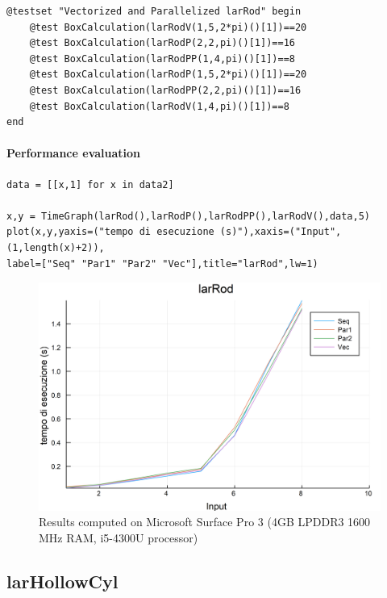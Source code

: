 \documentclass{article}
\begin{document}
\begin{Verbatim}
@testset "Vectorized and Parallelized larRod" begin
	@test BoxCalculation(larRodV(1,5,2*pi)()[1])==20
	@test BoxCalculation(larRodP(2,2,pi)()[1])==16
	@test BoxCalculation(larRodPP(1,4,pi)()[1])==8
	@test BoxCalculation(larRodP(1,5,2*pi)()[1])==20
	@test BoxCalculation(larRodPP(2,2,pi)()[1])==16
	@test BoxCalculation(larRodV(1,4,pi)()[1])==8
end
\end{Verbatim}

\paragraph{Performance evaluation}

\begin{Verbatim}
data = [[x,1] for x in data2]

x,y = TimeGraph(larRod(),larRodP(),larRodPP(),larRodV(),data,5)
plot(x,y,yaxis=("tempo di esecuzione (s)"),xaxis=("Input",(1,length(x)+2)),
label=["Seq" "Par1" "Par2" "Vec"],title="larRod",lw=1)

\end{Verbatim}

\begin{figure}[htbp] 
\centering 
\includegraphics[scale=.13]{larRodTime.png} 
\caption{Results computed on Microsoft Surface Pro  3 (4GB LPDDR3 1600 MHz RAM, i5-4300U processor)} 
\end{figure}
\subsection{larHollowCyl}
\end{document}
